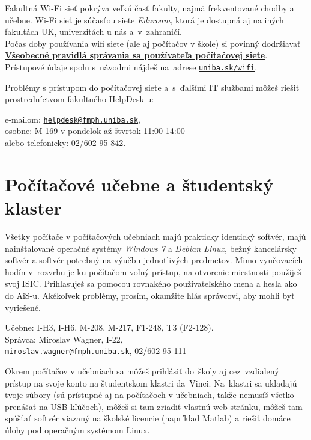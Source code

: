 Fakultná Wi-Fi sieť pokrýva veľkú časť fakulty, najmä frekventované
chodby a učebne. Wi-Fi sieť je súčasťou siete \emph{Eduroam}, ktorá je dostupná
aj na iných fakultách UK, univerzitách u nás a~v~zahraničí. \\

Počas doby používania wifi siete (ale aj počítačov v škole) si povinný dodržiavať \textbf{\href{https://zona.fmph.uniba.sk/fileadmin/fmfi/fakulta/legislativa/Vseobecne\_pravidla\_spravania\_sa\_pouzivatela\_informacnych\_technologii\_na\_FMFI\_UK.pdf}{Všeobecné pravidlá správania sa používateľa počítačovej siete}}. \\


 Prístupové údaje spolu s~návodmi nájdeš na~adrese \href{https://www.uniba.sk/wifi}{\texttt{uniba.sk/wifi}}.

Problémy s prístupom do počítačovej siete a~s~ďalšími IT službami môžeš riešiť prostredníctvom fakultného HelpDesk-u:

\medskip\noindent
e-mailom: \href{mailto:helpdesk@fmph.uniba.sk}{\texttt{helpdesk@fmph.uniba.sk}},\\
osobne: M-169 v pondelok až štvrtok 11:00-14:00\\
alebo telefonicky: 02/602 95 842.

\section{Počítačové učebne a študentský klaster}

Všetky počítače v počítačových učebniach majú prakticky identický
softvér, majú nainštalované operačné systémy \emph{Windows 7} a \emph{Debian Linux}, bežný kancelársky softvér a softvér potrebný na výučbu jednotlivých predmetov. Mimo vyučovacích hodín v~rozvrhu je ku počítačom voľný
prístup, na otvorenie miestnosti použiješ svoj ISIC. Prihlasuješ sa
pomocou rovnakého používateľského mena a hesla ako do AiS-u. Akékoľvek problémy, prosím, okamžite hlás správcovi, aby mohli byť vyriešené.

\medskip\noindent
Učebne: I-H3, I-H6, M-208, M-217, F1-248, T3 (F2-128).\\
Správca: Miroslav Wagner, I-22,\\
\href{mailto:miroslav.wagner@fmph.uniba.sk}{\texttt{miroslav.wagner@fmph.uniba.sk}}, 02/602 95 111

\medskip\noindent
Okrem počítačov v učebniach sa môžeš prihlásiť do~školy aj cez~vzdialený prístup na svoje konto na študentskom klastri da~Vinci. Na~klastri sa ukladajú tvoje súbory (sú prístupné aj na počítačoch v
učebniach, takže nemusíš všetko prenášať na USB kľúčoch), môžeš si tam zriadiť vlastnú web stránku, môžeš tam spúšťať softvér viazaný na školské licencie (napríklad Matlab) a riešiť domáce úlohy pod operačným systémom Linux.

